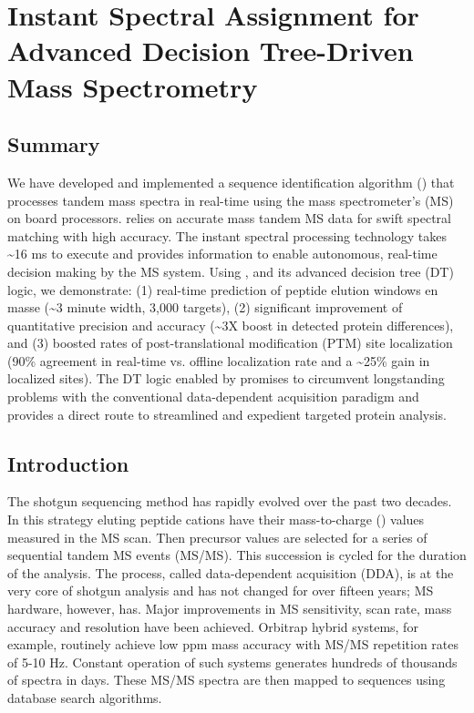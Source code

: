 \chapter{Instant Spectral Assignment for Advanced Decision Tree-Driven Mass Spectrometry}

\section{Summary}
We have developed and implemented a sequence identification algorithm (\inseq{}) that processes tandem mass spectra in real-time using the mass spectrometer's (MS) on board processors. \inseq{} relies on accurate mass tandem MS data for swift spectral matching with high accuracy. The instant spectral processing technology takes \textasciitilde16 ms to execute and provides information to enable autonomous, real-time decision making by the MS system. Using \inseq{}, and its advanced decision tree (DT) logic, we demonstrate: (1) real-time prediction of peptide elution windows en masse (\textasciitilde3 minute width, 3,000 targets), (2) significant improvement of quantitative precision and accuracy (\textasciitilde3X boost in detected protein differences), and (3) boosted rates of post-translational modification (PTM) site localization (90\% agreement in real-time vs. offline localization rate and a \textasciitilde25\% gain in localized sites). The DT logic enabled by \inseq{} promises to circumvent longstanding problems with the conventional data-dependent acquisition paradigm and provides a direct route to streamlined and expedient targeted protein analysis.

\section{Introduction}
The shotgun sequencing method has rapidly evolved over the past two decades.\cite{mudpit, bigtime} In this strategy eluting peptide cations have their mass-to-charge (\mz{}) values measured in the MS scan. Then precursor \mz{} values are selected for a series of sequential tandem MS events (MS/MS). This succession is cycled for the duration of the analysis. The process, called data-dependent acquisition (DDA), is at the very core of shotgun analysis and has not changed for over fifteen years; MS hardware, however, has. Major improvements in MS sensitivity, scan rate, mass accuracy and resolution have been achieved. Orbitrap hybrid systems, for example, routinely achieve low ppm mass accuracy with MS/MS repetition rates of 5-10 Hz.\cite{subppm,qexactive} Constant operation of such systems generates hundreds of thousands of spectra in days. These MS/MS spectra are then mapped to sequences using database search algorithms.\cite{sequest,mascot,omssa}

